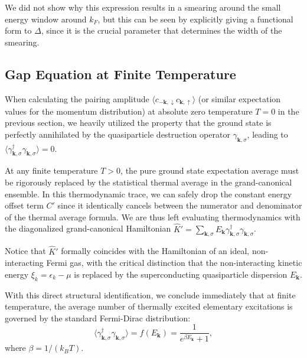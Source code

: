 We did not show why this expression results in a smearing around the small energy window around \(k_F\), but this can be seen by explicitly giving a functional form to \(\Delta\), since it is the crucial parameter that determines the width of the smearing.

\subsection{Gap Equation at Finite Temperature}

When calculating the pairing amplitude \( \langle c_{-\mathbf{k},\downarrow} c_{\mathbf{k},\uparrow} \rangle \) (or similar expectation values for the momentum distribution) at absolute zero temperature \( T = 0 \) in the previous section, we heavily utilized the property that the ground state is perfectly annihilated by the quasiparticle destruction operator \( \gamma_{\mathbf{k},\sigma} \), leading to \( \langle \gamma_{\mathbf{k},\sigma}^\dagger \gamma_{\mathbf{k},\sigma} \rangle = 0 \).

At any finite temperature \( T > 0 \), the pure ground state expectation average must be rigorously replaced by the statistical thermal average in the grand-canonical ensemble. In this thermodynamic trace, we can safely drop the constant energy offset term \( C' \) since it identically cancels between the numerator and denominator of the thermal average formula. We are thus left evaluating thermodynamics with the diagonalized grand-canonical Hamiltonian \( \hat{K}' = \sum_{\mathbf{k},\sigma} E_{\mathbf{k}} \gamma_{\mathbf{k},\sigma}^\dagger \gamma_{\mathbf{k},\sigma} \).

\begin{remark}
    Notice that \( \hat{K}' \) formally coincides with the Hamiltonian of an ideal, non-interacting Fermi gas, with the critical distinction that the non-interacting kinetic energy \( \xi_k = \epsilon_k - \mu \) is replaced by the superconducting quasiparticle dispersion \( E_{\mathbf{k}} \).
\end{remark}

With this direct structural identification, we conclude immediately that at finite temperature, the average number of thermally excited elementary excitations is governed by the standard Fermi-Dirac distribution:
\[
    \langle \gamma_{\mathbf{k},\sigma}^\dagger \gamma_{\mathbf{k},\sigma} \rangle = f(E_{\mathbf{k}}) = \frac{1}{e^{\beta E_{\mathbf{k}}} + 1},
\]
where \( \beta = 1/(k_B T) \).


